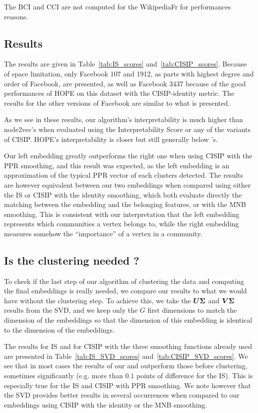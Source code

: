 The BCI and CCI are not computed for the WikipediaFr for performances reasons.

\subsection{Results}
The results are given in Table~\ref{tab:IS_scores} and~\ref{tab:CISIP_scores}. Because of space limitation, only Facebook 107 and 1912, as parts with highest degree and order of Facebook, are presented, as well as Facebook 3437 because of the good performances of HOPE on this dataset with the CISIP-identity metric. The results for the other versions of Facebook are similar to what is presented.

As we see in these results, our algorithm's interpretability is much higher than node2vec's when evaluated using the Interpretability Score or any of the variants of CISIP. HOPE's interpretability is closer but still generally below \parfaite{}'s.

Our left embedding greatly outperforms the right one when using CISIP with the PPR smoothing, and this result was expected, as the left embedding is an approximation of the typical PPR vector of each clusters detected. The results are however equivalent between our two embeddings when compared using either the IS or CISIP with the identity smoothing, which both evaluate directly the matching between the embedding and the belonging features, or with the MNB smoothing. This is consistent with our interpretation that the left embedding represents which communities a vertex belongs to, while the right embedding measures somehow the ``importance'' of a vertex in a community.

\subsection{Is the clustering needed ?}
To check if the last step of our algorithm of clustering the data and computing the final embeddings is really needed, we compare our results to what we would have without the clustering step. To achieve this, we take the $\boldsymbol{U}\boldsymbol{\Sigma}$ and $\boldsymbol{V}\boldsymbol{\Sigma}$ results from the SVD, and we keep only the $G$ first dimensions to match the dimension of the \parfaite{} embeddings so that the dimension of this embedding is identical to the dimension of the \parfaite{} embeddings.

The results for IS and for CISIP with the three smoothing functions already used are presented in Table~\ref{tab:IS_SVD_scores} and~\ref{tab:CISIP_SVD_scores}. We see that in most cases the results of our \newembLeft{} and \newembRight{} outperform those before clustering, sometimes significantly (e.g. more than $0.1$ points of difference for the IS). This is especially true for the IS and CISIP with PPR smoothing. We note however that the SVD provides better results in several occurrences when compared to our embeddings using CISIP with the identity or the MNB smoothing.

